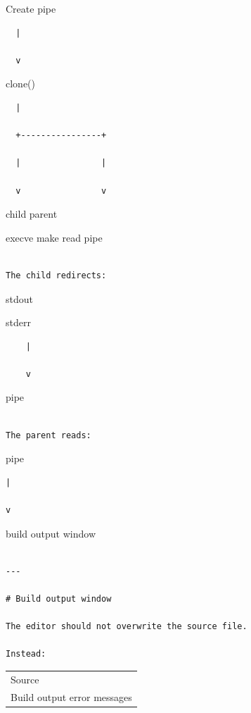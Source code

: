 \documentclass[
  oneside,
  openany]{book}
\begin{document}
Create pipe

\begin{verbatim}
  |

  v
\end{verbatim}

clone()

\begin{verbatim}
  |

  +----------------+

  |                |

  v                v
\end{verbatim}

child parent

execve make read pipe

\begin{verbatim}

The child redirects:
\end{verbatim}

stdout

stderr

\begin{verbatim}
    |

    v
\end{verbatim}

pipe

\begin{verbatim}

The parent reads:
\end{verbatim}

pipe

\begin{verbatim}
|

v
\end{verbatim}

build output window

\begin{verbatim}

---

# Build output window

The editor should not overwrite the source file.

Instead:
\end{verbatim}

\begin{longtable}[]{@{}
  >{\raggedright\arraybackslash}p{}@{}}
\toprule\noalign{}
\endhead
\bottomrule\noalign{}
\endlastfoot
Source \\
Build output error messages \\
\end{longtable}
\end{document}
